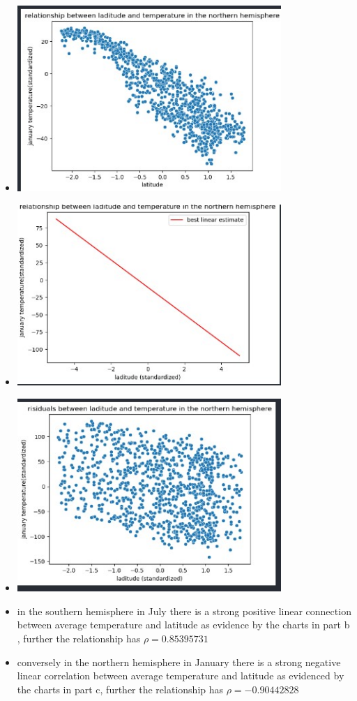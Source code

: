 \documentclass[12pt,twoside]{article}
\begin{document}
\begin{enumerate}
\begin{enumerate}
  \begin{itemize}
     \item  \includegraphics[width=10cm]{homework/homework_1/south_1.jpg}
 \item  \includegraphics[width=10cm]{homework/homework_1/south_22.jpg}
 \item  \includegraphics[width=10cm]{homework/homework_1/south_33.jpg}
 \item in the southern hemisphere in July there is a strong positive linear connection between average temperature and latitude as evidence by the charts in part b , further the relationship has $\rho=0.85395731$
 \item conversely in the northern hemisphere in January there is a strong negative linear correlation between average temperature and latitude as evidenced by the charts in part c, further the relationship has $\rho=-0.90442828$
 \end{itemize}
\end{enumerate}


\end{enumerate}
\end{document}
